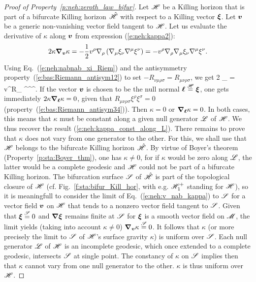\begin{proof}[Proof of Property~\ref{p:neh:zeroth_law_bifur}]
Let $\mathscr{H}$ be a Killing horizon that is part of a bifurcate Killing horizon
$\hat{\mathscr{H}}$ with respect to a Killing vector $\bm{\xi}$.
Let $\bm{v}$ be a generic non-vanishing vector field tangent to $\mathscr{H}$. Let us
evaluate the derivative of $\kappa$ along $\bm{v}$ from expression (\ref{e:neh:kappa2}):
\[ 2 \kappa \bm{\nabla}_{\bm{v}} \kappa =
    - \frac{1}{2} v^\rho \nabla_\rho \left( \nabla_\mu \xi_\nu \nabla^\mu \xi^\nu \right) =
    - v^\rho \nabla_\rho \nabla_\mu \xi_\nu \nabla^\mu \xi^\nu .\]
Using Eq.~(\ref{e:neh:nabnab_xi_Riem}) and the antisymmetry property~(\ref{e:bas:Riemann_antisym12}) to
set $-R_{\nu\mu\rho\sigma} = R_{\mu\nu\rho\sigma}$, we get
\be \label{e:neh:v_nab_kappa}
    2 \kappa \wnab_{}  \kappa = v^\rho R_{\mu\nu\rho\sigma} \xi^\sigma \nabla^\mu \xi^\nu .
\ee
If the vector $\bm{v}$ is chosen to be the null normal $\bm{\ell} \stackrel{\mathscr{H}}{=} \bm{\xi}$, one gets immediately
$2\kappa \bm{\nabla}_{\bm{\ell}}  \kappa = 0$, given that $R_{\mu\nu\rho\sigma} \xi^\rho \xi^\sigma = 0$
(property~(\ref{e:bas:Riemann_antisym34})). Then $\kappa = 0$ or $\bm{\nabla}_{\bm{\ell}}\kappa = 0$. In both
cases, this means that $\kappa$ must be constant along a given null generator $\mathscr{L}$ of $\mathscr{H}$.
We thus recover the result (\ref{e:neh:kappa_const_along_L}).
There remains to prove that $\kappa$ does not vary from one generator to the other.
For this, we shall use that $\mathscr{H}$ belongs to the bifurcate Killing horizon $\hat{\mathscr{H}}$.
By virtue of Boyer's theorem (Property~\ref{p:sta:Boyer_thm}), one has $\kappa\neq 0$, for if $\kappa$
would be zero along $\mathscr{L}$, the latter would be a complete geodesic and $\mathscr{H}$ could not be part of a
bifurcate Killing horizon. The bifurcation
surface $\mathscr{S}$ of $\hat{\mathscr{H}}$ is part of the topological closure of $\mathscr{H}$
(cf. Fig.~\ref{f:sta:bifur_Kill_hor}, with e.g. $\mathscr{H}_1^+$ standing for $\mathscr{H}$), so it is meaningfull to consider
the limit of Eq.~(\ref{e:neh:v_nab_kappa}) to $\mathscr{S}$ for a vector field $\bm{v}$ on $\mathscr{H}$ that tends to a nonzero
vector field tangent to $\mathscr{S}$. Given that
$\bm{\xi}\stackrel{\mathscr{S}}{=} 0$ and $\bm{\nabla}\bm{\xi}$ remains finite at $\mathscr{S}$ for
$\bm{\xi}$ is a smooth vector field on $\mathscr{M}$, the limit yields (taking into account $\kappa\neq 0$)
$\bm{\nabla}_{\bm{v}}  \kappa \stackrel{\mathscr{S}}{=} 0$.
It follows that $\kappa$ (or more precisely the limit to $\mathscr{S}$ of $\mathscr{H}$'s surface gravity $\kappa$) is uniform
over $\mathscr{S}$. Each null generator $\mathscr{L}$ of $\mathscr{H}$ is an incomplete geodesic, which once extended to a complete geodesic, intersects $\mathscr{S}$ at single point. The constancy of $\kappa$ on $\mathscr{S}$ implies then that $\kappa$ cannot vary from one
null generator to the other. $\kappa$ is thus uniform over $\mathscr{H}$.
\end{proof}

